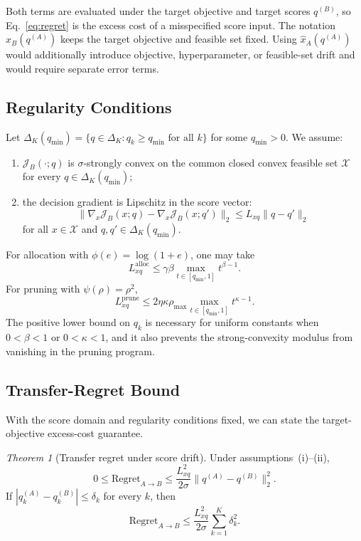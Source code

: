 \documentclass[accepted]{uai2026}%
\theoremstyle{remark}%
\newtheorem{theorem}{Theorem}
\begin{document}
Both terms are evaluated under the target objective and target scores
$q^{(B)}$, so Eq.~\eqref{eq:regret} is the excess cost of a misspecified
score input. The notation $\widehat x_B(q^{(A)})$ keeps
the target objective and feasible set fixed. Using
$\widehat x_A(q^{(A)})$ would additionally introduce objective,
hyperparameter, or feasible-set drift and would require separate error terms.


\subsection{Regularity Conditions}
Let $\Delta_K(q_{\min})=
\{q\in\Delta_K:q_k\ge q_{\min}\text{ for all }k\}$ for some
$q_{\min}>0$. We assume:
\begin{enumerate}[label=(\roman*)]
  \item $\mathcal{J}_B(\cdot;q)$ is $\sigma$-strongly convex on the common
  closed convex feasible set $\mathcal X$ for every
  $q\in\Delta_K(q_{\min})$;
  \item the decision gradient is Lipschitz in the score vector:
  \[
  \|\nabla_x\mathcal J_B(x;q)-\nabla_x\mathcal J_B(x;q')\|_2
  \le L_{xq}\|q-q'\|_2
  \]
  for all $x\in\mathcal X$ and
  $q,q'\in\Delta_K(q_{\min})$.
\end{enumerate}
For allocation with $\phi(e)=\log(1+e)$, one may take
\[
L_{xq}^{\mathrm{alloc}}
\le \gamma\beta\max_{t\in[q_{\min},1]}t^{\beta-1}.
\]
For pruning with $\psi(\rho)=\rho^2$,
\[
L_{xq}^{\mathrm{prune}}
\le 2\eta\kappa\rho_{\max}
\max_{t\in[q_{\min},1]}t^{\kappa-1}.
\]
The positive lower bound on $q_k$ is necessary for uniform constants when
$0<\beta<1$ or $0<\kappa<1$, and it also prevents the strong-convexity
modulus from vanishing in the pruning program.

\subsection{Transfer-Regret Bound}
With the score domain and regularity conditions fixed, we can state the
target-objective excess-cost guarantee.

\begin{theorem}[Transfer regret under score drift]
\label{thm:transfer}
Under assumptions~(i)--(ii),
\begin{equation}
\label{eq:regret_bound}
0\le \mathrm{Regret}_{A\to B}
\le
\frac{L_{xq}^2}{2\sigma}
\|q^{(A)}-q^{(B)}\|_2^2.
\end{equation}
If $|q_k^{(A)}-q_k^{(B)}|\le\delta_k$ for every $k$, then
\[
\mathrm{Regret}_{A\to B}
\le
\frac{L_{xq}^2}{2\sigma}\sum_{k=1}^K\delta_k^2.
\]
\end{theorem}
\end{document}
